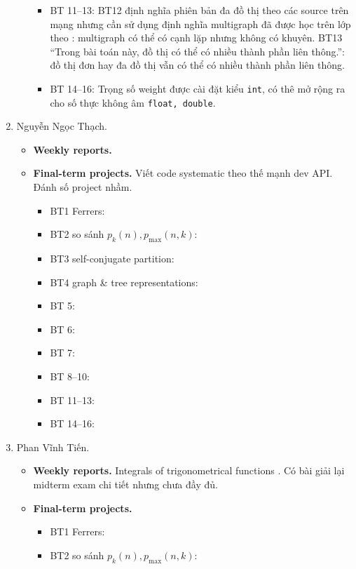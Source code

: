 \documentclass{article}
\begin{document}
\begin{enumerate}
\begin{itemize}
\begin{itemize}
            \item BT 11--13: BT12 định nghĩa phiên bản đa đồ thị theo các source trên mạng nhưng cần sử dụng định nghĩa multigraph đã được học trên lớp theo \cite{Shahriari2022}: multigraph có thể có cạnh lặp nhưng không có khuyên. BT13 ``Trong bài toán này, đồ thị có thể có nhiều thành phần liên thông.'': đồ thị đơn hay đa đồ thị vẫn có thể có nhiều thành phần liên thông.
            \item BT 14--16: Trọng số weight được cài đặt kiểu {\tt int}, có thê mở rộng ra cho số thực không âm {\tt float, double}.
        \end{itemize}
    \end{itemize}
    \item {\sc Nguyễn Ngọc Thạch.}
    \begin{itemize}
        \item {\bf Weekly reports.}
        \item {\bf Final-term projects.} Viết code systematic theo thế mạnh dev API. Đánh số project nhầm.
        \begin{itemize}
            \item BT1 Ferrers:
            \item BT2 so sánh $p_k(n),p_{\max}(n,k)$:
            \item BT3 self-conjugate partition:
            \item BT4 graph \& tree representations:
            \item BT 5:
            \item BT 6:
            \item BT 7:
            \item BT 8--10:
            \item BT 11--13:
            \item BT 14--16:
        \end{itemize}
    \end{itemize}
    \item {\sc Phan Vĩnh Tiến.}
    \begin{itemize}
        \item {\bf Weekly reports.} Integrals of trigonometrical functions . Có bài giải lại midterm exam chi tiết nhưng chưa đầy đủ.
        \item {\bf Final-term projects.}
        \begin{itemize}
            \item BT1 Ferrers:
            \item BT2 so sánh $p_k(n),p_{\max}(n,k)$:

\end{itemize}
\end{itemize}
\end{enumerate}
\end{document}
